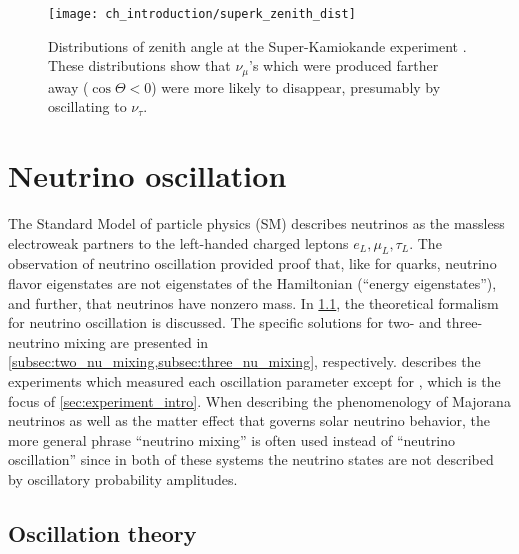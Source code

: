 \begin{figure}
    \centering
    \texttt{[image: ch\_introduction/superk\_zenith\_dist]}
    \caption{
        Distributions of zenith angle at the Super-Kamiokande experiment
        \cite{superk1998}.
        These distributions show that $\nu_\mu$'s which were produced farther away
        ($\cos\Theta < 0$)
        were more likely to disappear, presumably by oscillating to $\nu_\tau$.
    }
    \label{fig:superk_zenith}
\end{figure}


\section{Neutrino oscillation}
\label{sec:osc_intro}

The Standard Model of particle physics (SM)
describes neutrinos as the massless electroweak partners
to the left-handed charged leptons $e_L,\mu_L,\tau_L$.
The observation of neutrino oscillation provided proof that,
like for quarks, neutrino flavor eigenstates are not
eigenstates of the Hamiltonian (``energy eigenstates''),
and further, that neutrinos have nonzero mass.
In \cref{subsec:theory}, the theoretical formalism for neutrino oscillation is discussed.
The specific solutions for two- and three-neutrino mixing
are presented in \cref{subsec:two_nu_mixing,subsec:three_nu_mixing},
respectively.
 describes the experiments which measured
each oscillation parameter
except for \thetaot{}, which is the focus of \cref{sec:experiment_intro}.
When describing the phenomenology of Majorana neutrinos
as well as the matter effect that governs solar neutrino behavior,
the more general phrase ``neutrino mixing''
is often used instead of ``neutrino oscillation''
since in both of these systems
the neutrino states are not described by oscillatory probability amplitudes.

\subsection{Oscillation theory}
\label{subsec:theory}

